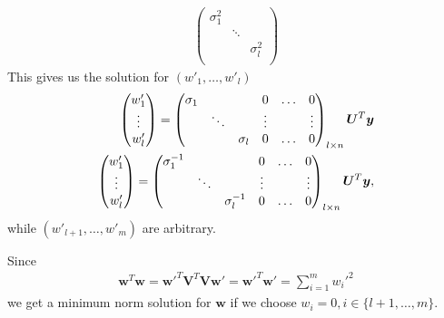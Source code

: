 \begin{align}
    \begin{pmatrix}
        \sigma_{1}^2 &        &               \\
                     & \ddots &               \\
                     &        &  \sigma_{l}^2 \\
    \end{pmatrix} 
\end{align}
This gives us the solution for $(w'_{1},\hdots, w'_l)$
\begin{align}    
    \begin{pmatrix}
        w'_1\\
        \vdots \\
        w'_l
    \end{pmatrix} = 
    \begin{pmatrix}
        \sigma_{1}   &        &               & 0       & \hdots & 0      \\
                     & \ddots &               & \vdots  &        & \vdots \\
                     &        &  \sigma_{l}   & 0       & \hdots & 0      \\                     
    \end{pmatrix}_{l \times n}\bm{U}^T \bm{y} \\
    \begin{pmatrix}
        w'_1\\
        \vdots \\
        w'_l
    \end{pmatrix} = 
    \begin{pmatrix}
        \sigma_{1}^{-1}   &        &               & 0       & \hdots & 0      \\
                     & \ddots &                    & \vdots  &        & \vdots \\
                     &        &  \sigma_{l}^{-1}   & 0       & \hdots & 0      \\                     
    \end{pmatrix}_{l \times n}\bm{U}^T \bm{y}, \\
\end{align}
while $(w'_{l+1},\hdots, w'_m)$ are arbitrary.

Since 
\begin{align}
\bm{w}^T \bm{w} = \bm{w}'^T \bm{V}^T \mathbf{V} \bm{w}'=\bm{w}'^T \bm{w}' = \sum_{i=1}^{m}w_{i}'^2
\end{align}
we get a minimum norm solution for $\bm{w}$ if we choose $w_{i}=0, i \in \{l+1,\hdots, m\}$.
